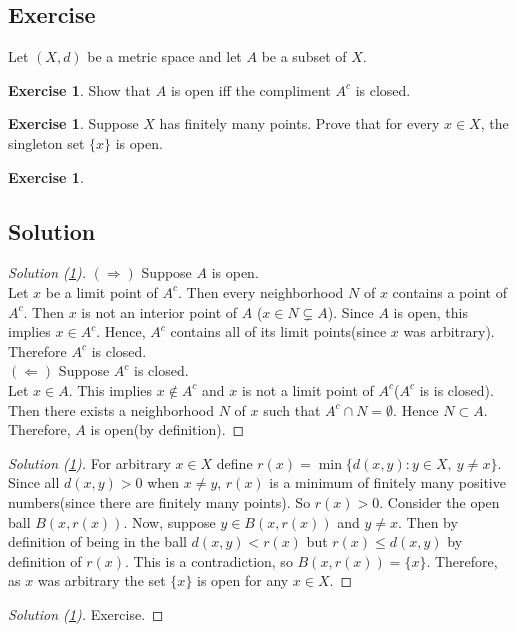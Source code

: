 \documentclass[	DIV=calc,paper=a4,fontsize=11pt]{scrartcl}	 	%
\theoremstyle{definition}
\newtheorem{exer}[thm]{Exercise}
\theoremstyle{plain}
\theoremstyle{remark}
\begin{document}
\newpage
\subsection{Exercise}
Let $(X,d)$ be a metric space and let $A$ be a subset of $X$.
\begin{exer}\label{021}
Show that $A$ is open iff the compliment $A^c$ is closed.
\end{exer}

\begin{exer}\label{022}
Suppose $X$ has finitely many points. Prove that for every $x\in X$, the singleton set $\{x\}$ is open.
\end{exer}

\begin{exer}\label{023}
\end{exer}

\newpage
\subsection*{Solution}
\begin{proof}[Solution (\ref{021})]
$(\Rightarrow)$ Suppose $A$ is open. \\
Let $x$ be a limit point of $A^c$. Then every neighborhood $N$ of $x$ contains a point of $A^c$. Then $x$ is not an interior point of $A$ ($ x\in N\subsetneq A$). Since $A$ is open, this implies $x\in A^c$. Hence, $A^c$ contains all of its limit points(since $x$ was arbitrary). Therefore $A^c$ is closed.\\
$(\Leftarrow)$ Suppose $A^c$ is closed.\\
Let $x\in A$. This implies $x\notin A^c$ and $x$ is not a limit point of $A^c$($A^c$ is is closed). Then there exists a neighborhood $N$ of $x$ such that $A^c\cap N=\emptyset$. Hence $N\subset A$. Therefore, $A$ is open(by definition).
\end{proof}
\begin{proof}[Solution (\ref{022})]
For arbitrary $x\in X$ define $r(x)=\min\{d(x,y):y\in X,\ y\neq x\}$. Since all $d(x,y)>0$ when $x\neq y$, $r(x)$ is a minimum of finitely many positive numbers(since there are finitely many points). So $r(x)>0$. Consider the open ball $B(x,r(x))$. Now, suppose $y\in B(x,r(x))$ and $y\neq x$. Then by definition of being in the ball $d(x,y)<r(x)$ but $r(x)\leq d(x,y)$ by definition of $r(x)$. This is a contradiction, so $B(x,r(x))=\{x\}$. Therefore, as $x$ was arbitrary the set $\{x\}$ is open for any $x\in X$.
\end{proof}
\begin{proof}[Solution (\ref{023})]
Exercise.
\end{proof}
\end{document}

